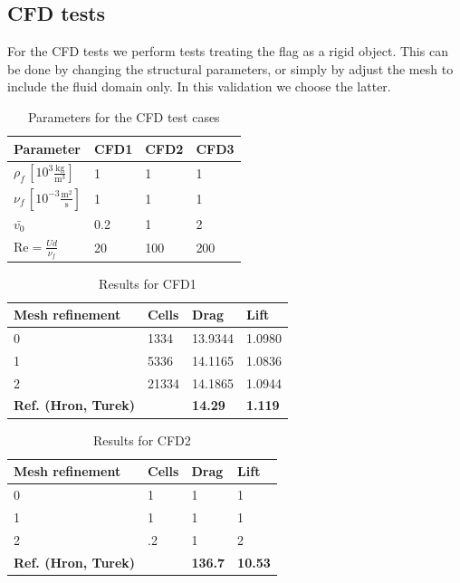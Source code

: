 \subsection{CFD tests}
For the CFD tests we perform tests treating the flag as a rigid object. This can be done by changing the structural parameters, or simply by adjust the mesh to include the fluid domain only. In this validation we choose the latter. 

\begin{table}[!ht]
\begin{center}
  \begin{tabular}{l | l | l | l} \hline
	Parameter & CFD1 & CFD2 & CFD3 \\ \hline
    $\rho_f\, [10^3\frac{\text{kg}}{\text{m}^3}]$  & 1 & 1 & 1 \\   \hline
    $\nu_f\, [10^{-3}\frac{\text{m}^2}{\text{s}}]$ & 1 & 1 & 1 \\ \hline
    $\bar{v_0}$ & 0.2 & 1 & 2   \\ \hline \hline
    $\text{Re} = \frac{Ud}{\nu_f}$ & 20 & 100 & 200 \\ \hline 
    \hline
  \end{tabular}
  \caption{Parameters for the CFD test cases}
\end{center}
\end{table}
\begin{table}[!ht]
\begin{center}
  \begin{tabular}{l | l | l | l} \hline
	Mesh refinement & Cells & Drag & Lift \\ \hline
    0  & 1334 & 13.9344 & 1.0980  \\   \hline
    1 & 5336 & 14.1165 & 1.0836 \\ \hline
    2 & 21334 & 14.1865 & 1.0944  \\ \hline \hline
    \textbf{Ref. (Hron, Turek)}  & & \textbf{14.29} & \textbf{1.119} \\ \hline 
    \hline
  \end{tabular}
\end{center}
\caption{Results for CFD1}
\end{table}

\begin{table}[!ht]
\begin{center}
  \begin{tabular}{l | l | l | l} \hline
	Mesh refinement & Cells & Drag & Lift \\ \hline
    0  & 1 & 1 & 1 \\   \hline
    1 & 1 & 1 & 1 \\ \hline
    2 &.2 & 1 & 2   \\ \hline \hline
    \textbf{Ref. (Hron, Turek)}  & & \textbf{136.7} & \textbf{10.53} \\ \hline 
    \hline
  \end{tabular}
\end{center}
\caption{Results for CFD2}
\end{table}
